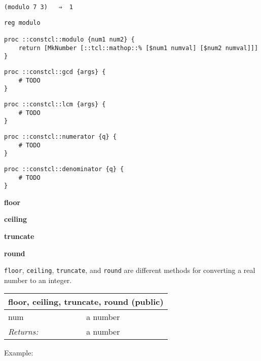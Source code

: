 \documentclass{report}
\begin{document}
\noindent\makebox[\linewidth]{\rule{\linewidth}{0.4pt}}
\begin{lstlisting}
(modulo 7 3)   ⇒  1
\end{lstlisting}
\noindent\makebox[\linewidth]{\rule{\linewidth}{0.4pt}}
\noindent\makebox[\linewidth]{\rule{\linewidth}{0.4pt}}
\begin{lstlisting}
reg modulo
 
proc ::constcl::modulo {num1 num2} {
    return [MkNumber [::tcl::mathop::% [$num1 numval] [$num2 numval]]]
}
\end{lstlisting}
\noindent\makebox[\linewidth]{\rule{\linewidth}{0.4pt}}
\noindent\makebox[\linewidth]{\rule{\linewidth}{0.4pt}}
\begin{lstlisting}
proc ::constcl::gcd {args} {
    # TODO
}
\end{lstlisting}
\noindent\makebox[\linewidth]{\rule{\linewidth}{0.4pt}}
\noindent\makebox[\linewidth]{\rule{\linewidth}{0.4pt}}
\begin{lstlisting}
proc ::constcl::lcm {args} {
    # TODO
}
\end{lstlisting}
\noindent\makebox[\linewidth]{\rule{\linewidth}{0.4pt}}
\noindent\makebox[\linewidth]{\rule{\linewidth}{0.4pt}}
\begin{lstlisting}
proc ::constcl::numerator {q} {
    # TODO
}
\end{lstlisting}
\noindent\makebox[\linewidth]{\rule{\linewidth}{0.4pt}}
\noindent\makebox[\linewidth]{\rule{\linewidth}{0.4pt}}
\begin{lstlisting}
proc ::constcl::denominator {q} {
    # TODO
}
\end{lstlisting}
\noindent\makebox[\linewidth]{\rule{\linewidth}{0.4pt}}

\textbf{floor}


\textbf{ceiling}


\textbf{truncate}


\textbf{round}


\texttt{floor}, \texttt{ceiling}, \texttt{truncate}, and \texttt{round} are different methods for converting a real number to an integer.

\begin{tabular}{ |l l| }
\hline
\multicolumn{2}{|l|}{floor, ceiling, truncate, round (public)} \\
\hline
num & a number \\
\textit{Returns:} & a number \\
\hline
\end{tabular}


Example:
\end{document}

